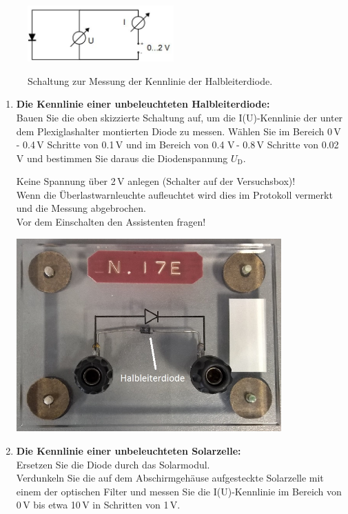 \begin{figure}[h]
	\centering
		\includegraphics[width=0.5\textwidth]{Abbildungen/Schaltung_Kennlinie.jpg}
	\label{fig:Schaltung_Kennlinie}
	\caption{Schaltung zur Messung der Kennlinie der Halbleiterdiode.}
\end{figure}

\begin{enumerate}
	\item \textbf{Die Kennlinie einer unbeleuchteten Halbleiterdiode:}\\
		Bauen Sie die oben skizzierte Schaltung auf, um die I(U)-Kennlinie der unter dem Plexiglashalter montierten Diode zu messen. Wählen Sie im Bereich 0\,V - 0.4\,V Schritte von 0.1\,V und im Bereich von 0.4 V\,- 0.8\,V Schritte von 0.02\,V und bestimmen Sie daraus die Diodenspannung $U_{\mathrm{D}}$.\\
		\begin{minipage}{0.6\textwidth}
		\begin{jason}
		Keine Spannung über 2\,V anlegen (Schalter auf der Versuchsbox)!\\
		Wenn die Überlastwarnleuchte aufleuchtet wird dies im Protokoll vermerkt und die Messung abgebrochen.\\
		Vor dem Einschalten den Assistenten fragen!
		\end{jason}
		\end{minipage}
		\begin{minipage}{0.4\textwidth}
			\includegraphics[width=0.8\textwidth]{Abbildungen/Diode.jpg}
			\label{fig:Bild15}
		\end{minipage}
	\item \textbf{Die Kennlinie einer unbeleuchteten Solarzelle:}\\
		Ersetzen Sie die Diode durch das Solarmodul.\\
		Verdunkeln Sie die auf dem Abschirmgehäuse aufgesteckte Solarzelle mit einem der optischen Filter und messen Sie die I(U)-Kennlinie im Bereich von 0\,V bis etwa 10\,V in Schritten von 1\,V.
 

\end{enumerate}
